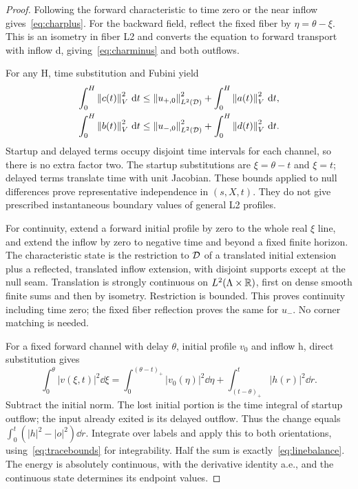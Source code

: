 \begin{proof}
Following the forward characteristic to time zero or the near inflow gives~\eqref{eq:charplus}. For the backward field, reflect the fixed fiber by $\eta=\theta-\xi$. This is an isometry in fiber L2 and converts the equation to forward transport with inflow d, giving~\eqref{eq:charminus} and both outflows.

For any H, time substitution and Fubini yield
\begin{align}
\int_0^H\left\lVert c(t)\right\rVert_V^2\,\mathrm d t&\le\left\lVert u_{+,0}\right\rVert_{L^2(\mathcal D)}^2+\int_0^H\left\lVert a(t)\right\rVert_V^2\,\mathrm d t,\notag\\
\int_0^H\left\lVert b(t)\right\rVert_V^2\,\mathrm d t&\le\left\lVert u_{-,0}\right\rVert_{L^2(\mathcal D)}^2+\int_0^H\left\lVert d(t)\right\rVert_V^2\,\mathrm d t.\label{eq:tracebounds}
\end{align}
Startup and delayed terms occupy disjoint time intervals for each channel, so there is no extra factor two. The startup substitutions are $\xi=\theta-t$ and $\xi=t$; delayed terms translate time with unit Jacobian. These bounds applied to null differences prove representative independence in $(s,X,t)$. They do not give prescribed instantaneous boundary values of general L2 profiles.

For continuity, extend a forward initial profile by zero to the whole real $\xi$ line, and extend the inflow by zero to negative time and beyond a fixed finite horizon. The characteristic state is the restriction to $\mathcal D$ of a translated initial extension plus a reflected, translated inflow extension, with disjoint supports except at the null seam. Translation is strongly continuous on $L^2(\Lambda\times\mathbb R)$, first on dense smooth finite sums and then by isometry. Restriction is bounded. This proves continuity including time zero; the fixed fiber reflection proves the same for $u_-$. No corner matching is needed.

For a fixed forward channel with delay $\theta$, initial profile $v_0$ and inflow h, direct substitution gives
\begin{equation}\label{eq:fiberenergy}
\int_0^\theta|v(\xi,t)|^2\dd\xi
=\int_0^{(\theta-t)_+}|v_0(\eta)|^2\dd\eta
+\int_{(t-\theta)_+}^{t}|h(r)|^2\dd r.
\end{equation}
Subtract the initial norm. The lost initial portion is the time integral of startup outflow; the input already exited is its delayed outflow. Thus the change equals $\int_0^t(|h|^2-|o|^2)\dd r$. Integrate over labels and apply this to both orientations, using~\eqref{eq:tracebounds} for integrability. Half the sum is exactly~\eqref{eq:linebalance}. The energy is absolutely continuous, with the derivative identity a.e., and the continuous state determines its endpoint values.
\end{proof}

